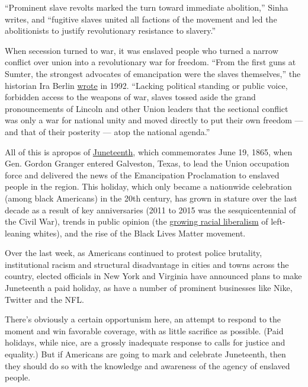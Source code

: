 ``Prominent slave revolts marked the turn toward immediate abolition,''
Sinha writes, and ``fugitive slaves united all factions of the movement
and led the abolitionists to justify revolutionary resistance to
slavery.''

When secession turned to war, it was enslaved people who turned a narrow
conflict over union into a revolutionary war for freedom. ``From the
first guns at Sumter, the strongest advocates of emancipation were the
slaves themselves,'' the historian Ira Berlin
\href{https://www.washingtonpost.com/archive/opinions/1992/12/27/how-the-slaves-freed-themselves/7d58b82c-3446-4f96-a07d-52fc868eb960/}{wrote}
in 1992. ``Lacking political standing or public voice, forbidden access
to the weapons of war, slaves tossed aside the grand pronouncements of
Lincoln and other Union leaders that the sectional conflict was only a
war for national unity and moved directly to put their own freedom ---
and that of their posterity --- atop the national agenda.''

All of this is apropos of
\href{https://www.nytimes.com/interactive/2020/06/18/style/juneteenth-celebration.html}{Juneteenth},
which commemorates June 19, 1865, when Gen. Gordon Granger entered
Galveston, Texas, to lead the Union occupation force and delivered the
news of the Emancipation Proclamation to enslaved people in the region.
This holiday, which only became a nationwide celebration (among black
Americans) in the 20th century, has grown in stature over the last
decade as a result of key anniversaries (2011 to 2015 was the
sesquicentennial of the Civil War), trends in public opinion (the
\href{https://www.vox.com/2019/3/22/18259865/great-awokening-white-liberals-race-polling-trump-2020}{growing
racial liberalism} of left-leaning whites), and the rise of the Black
Lives Matter movement.

Over the last week, as Americans continued to protest police brutality,
institutional racism and structural disadvantage in cities and towns
across the country, elected officials in New York and Virginia have
announced plans to make Juneteenth a paid holiday, as have a number of
prominent businesses like Nike, Twitter and the NFL.

There's obviously a certain opportunism here, an attempt to respond to
the moment and win favorable coverage, with as little sacrifice as
possible. (Paid holidays, while nice, are a grossly inadequate response
to calls for justice and equality.) But if Americans are going to mark
and celebrate Juneteenth, then they should do so with the knowledge and
awareness of the agency of enslaved people.

